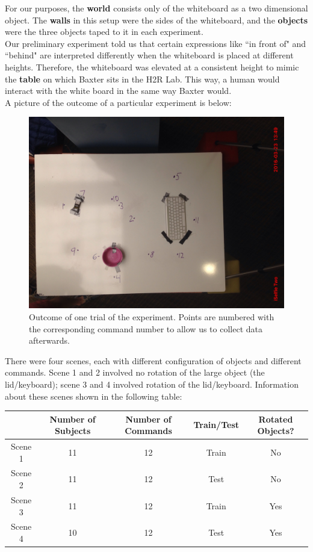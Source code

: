 \documentclass[12pt,letterpaper]{article}
\newcommand\tab[1][1cm]{\hspace*{#1}}
\begin{document}
For our purposes, the \textbf{world} consists only of the whiteboard as a two dimensional object. The \textbf{walls} in this setup were the sides of the whiteboard, and the \textbf{objects} were the three objects taped to it in each experiment.\\
\tab Our preliminary experiment told us that certain expressions like ``in front of" and ``behind" are interpreted differently when the whiteboard is placed at different heights. Therefore, the whiteboard was elevated at a consistent height to mimic the \textbf{table} on which Baxter sits in the H2R Lab. This way, a human would interact with the white board in the same way Baxter would.\\
\tab A picture of the outcome of a particular experiment is below:
\begin{figure}[H]
\centering
\includegraphics[scale=.1]{"images/scene1"}
\caption{Outcome of one trial of the experiment. Points are numbered with the corresponding command number to allow us to collect data afterwards.}
\label{fig:experiment}
\end{figure}
\tab There were four scenes, each with different configuration of objects and different commands. Scene 1 and 2 involved no rotation of the large object (the lid/keyboard); scene 3 and 4 involved rotation of the lid/keyboard. Information about these scenes shown in the following table: \\


\begin{tabular}{c c c c c}

 & Number of Subjects & Number of Commands & Train/Test & Rotated Objects?\\
\hline
Scene 1 & 11 & 12 & Train & No\\
Scene 2 & 11 & 12 & Test & No\\
Scene 3 & 11 & 12 & Train & Yes\\
Scene 4 & 10 & 12 & Test & Yes
\end{tabular}
\end{document}
